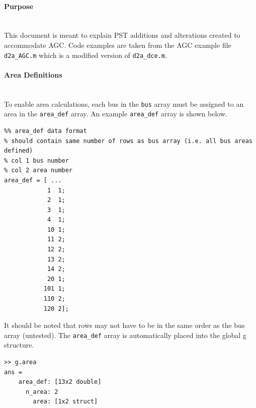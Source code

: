 \documentclass[12pt]{article}
\begin{document}
\onehalfspacing
\paragraph{Purpose} \ \\
This document is meant to explain PST additions and alterations created to accommodate AGC.
Code examples are taken from the AGC example file \verb|d2a_AGC.m| which is a modified version of \verb|d2a_dce.m|.


\paragraph{Area Definitions} \ \\
To enable area calculations, each bus  in the \verb|bus| array must be assigned to an area in the \verb|area_def| array.
An example \verb|area_def| array is shown below.
\begin{verbatim}
%% area_def data format
% should contain same number of rows as bus array (i.e. all bus areas defined)
% col 1 bus number
% col 2 area number
area_def = [ ...
            1  1;
            2  1;
            3  1;
            4  1;
            10 1;
            11 2;
            12 2;
            13 2;
            14 2; 
            20 1;
           101 1; 
           110 2;
           120 2];
\end{verbatim}

It should be noted that rows may not have to be in the same order as the bus array (untested).
The \verb|area_def| array is automatically placed into the global g structure.
\begin{verbatim}
>> g.area
ans = 
    area_def: [13x2 double]
      n_area: 2
        area: [1x2 struct]
\end{verbatim}
\end{document}
